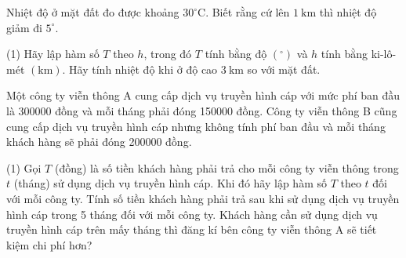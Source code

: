 \begin{vd}
	Nhiệt độ ở mặt đất đo được khoảng $30^{\circ} \mathrm{C}$. Biết rằng cứ lên $1 \mathrm{~km}$ thì nhiệt độ giảm đi $5^{\circ}$.
	\begin{tasks}(1)
		\task Hãy lập hàm số $T$ theo $h$, trong đó $T$ tính bằng độ $\left({ }^{\circ}\right)$ và $h$ tính bằng ki-lô-mét $(\mathrm{km})$.
		\task Hãy tính nhiệt độ khi ở độ cao $3 \mathrm{~km}$ so với mặt đất.
	\end{tasks}
\end{vd}

\begin{vd}%
	Một công ty viễn thông A cung cấp dịch vụ truyền hình cáp với mức phí ban đầu là 300000 đồng và mỗi tháng phải đóng 150000 đồng. Công ty viễn thông B cũng cung cấp dịch vụ truyền hình cáp nhưng không tính phí ban đầu và mỗi tháng khách hàng sẽ phải đóng 200000 đồng.
	\begin{tasks}(1)
		\task Gọi $T$ (đồng) là số tiền khách hàng phải trả cho mỗi công ty viễn thông trong $t$ (tháng) sử dụng dịch vụ truyền hình cáp. Khi đó hãy lập hàm số $T$ theo $t$ đối với mỗi công ty.
		\task Tính số tiền khách hàng phải trả sau khi sử dụng dịch vụ truyền hình cáp trong 5 tháng đối với mỗi công ty.
		\task Khách hàng cần sử dụng dịch vụ truyền hình cáp trên mấy tháng thì đăng kí bên công ty viễn thông A sẽ tiết kiệm chi phí hơn?
	\end{tasks}
\end{vd}
